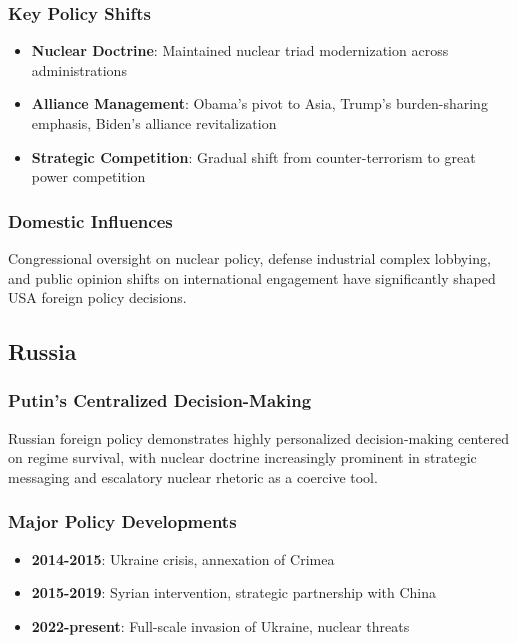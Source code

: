 \documentclass[a4paper, 11pt]{article}
\begin{document}
\subsubsection{Key Policy Shifts}
\begin{itemize}
	\item \textbf{Nuclear Doctrine}: Maintained nuclear triad modernization across administrations
	\item \textbf{Alliance Management}: Obama's pivot to Asia, Trump's burden-sharing emphasis, Biden's alliance revitalization
	\item \textbf{Strategic Competition}: Gradual shift from counter-terrorism to great power competition
\end{itemize}

\subsubsection{Domestic Influences}
Congressional oversight on nuclear policy, defense industrial complex lobbying, and public opinion shifts on international engagement have significantly shaped USA foreign policy decisions.

\subsection{Russia}

\subsubsection{Putin's Centralized Decision-Making}
Russian foreign policy demonstrates highly personalized decision-making centered on regime survival, with nuclear doctrine increasingly prominent in strategic messaging and escalatory nuclear rhetoric as a coercive tool.

\subsubsection{Major Policy Developments}
\begin{itemize}
	\item \textbf{2014-2015}: Ukraine crisis, annexation of Crimea
	\item \textbf{2015-2019}: Syrian intervention, strategic partnership with China
	\item \textbf{2022-present}: Full-scale invasion of Ukraine, nuclear threats
\end{itemize}
\end{document}
